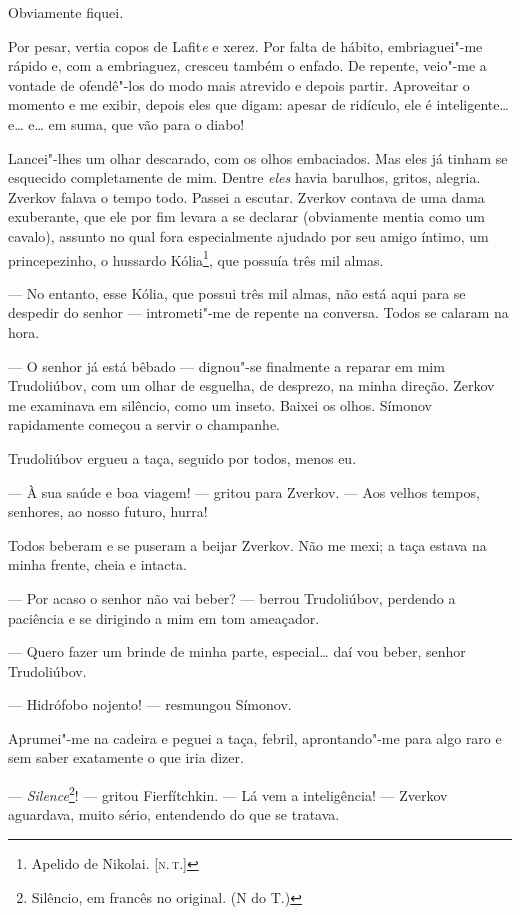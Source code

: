 Obviamente fiquei.

Por pesar, vertia copos de Lafit\emph{e} e xerez. Por falta de hábito,
embriaguei"-me rápido e, com a embriaguez, cresceu também o enfado. De
repente, veio"-me a vontade de ofendê"-los do modo mais atrevido e depois
partir. Aproveitar o momento e me exibir, depois eles que digam: apesar
de ridículo, ele é inteligente\ldots{} e\ldots{} e\ldots{} em suma, que vão para o
diabo!

Lancei"-lhes um olhar descarado, com os olhos embaciados. Mas eles já
tinham se esquecido completamente de mim. Dentre \emph{eles} havia
barulhos, gritos, alegria. Zverkov falava o tempo todo. Passei a
escutar. Zverkov contava de uma dama exuberante, que ele por fim levara
a se declarar (obviamente mentia como um cavalo), assunto no qual fora
especialmente ajudado por seu amigo íntimo, um princepezinho, o hussardo
Kólia\footnote{Apelido de Nikolai. {[}\textsc{n.\,t.}{]}}, que possuía três mil
almas.

--- No entanto, esse Kólia, que possui três mil almas, não está aqui para
se despedir do senhor --- intrometi"-me de repente na conversa. Todos se
calaram na hora.

--- O senhor já está bêbado --- dignou"-se finalmente a reparar em mim
Trudoliúbov, com um olhar de esguelha, de desprezo, na minha direção.
Zerkov me examinava em silêncio, como um inseto. Baixei os olhos.
Símonov rapidamente começou a servir o champanhe.

Trudoliúbov ergueu a taça, seguido por todos, menos eu.

--- À sua saúde e boa viagem! --- gritou para Zverkov. --- Aos velhos tempos,
senhores, ao nosso futuro, hurra!

Todos beberam e se puseram a beijar Zverkov. Não me mexi; a taça estava
na minha frente, cheia e intacta.

--- Por acaso o senhor não vai beber? --- berrou Trudoliúbov, perdendo a
paciência e se dirigindo a mim em tom ameaçador.

--- Quero fazer um brinde de minha parte, especial\ldots{} daí vou beber,
senhor Trudoliúbov.

--- Hidrófobo nojento! --- resmungou Símonov.

Aprumei"-me na cadeira e peguei a taça, febril, aprontando"-me para algo
raro e sem saber exatamente o que iria dizer.

--- \emph{Silence}\footnote{Silêncio, em francês no original. (N do T.)}!
--- gritou Fierfítchkin. --- Lá vem a inteligência! --- Zverkov aguardava,
muito sério, entendendo do que se tratava.

